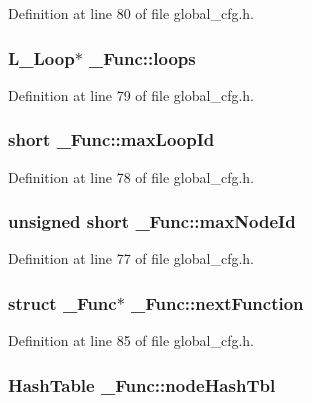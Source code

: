 Definition at line 80 of file global\_\-cfg.h.
\subsubsection{\setlength{\rightskip}{0pt plus 5cm}L\_\-Loop$\ast$ \bf{\_\-Func::loops}}\label{struct__Func_fe46df0a6639bb86229a61502c7448d3}




Definition at line 79 of file global\_\-cfg.h.
\subsubsection{\setlength{\rightskip}{0pt plus 5cm}short \bf{\_\-Func::max\-Loop\-Id}}\label{struct__Func_40490fbdaaf9e9e8d79f57413e8d32cf}




Definition at line 78 of file global\_\-cfg.h.
\subsubsection{\setlength{\rightskip}{0pt plus 5cm}unsigned short \bf{\_\-Func::max\-Node\-Id}}\label{struct__Func_facf362425dff8500e7dd797e6c30db2}




Definition at line 77 of file global\_\-cfg.h.
\subsubsection{\setlength{\rightskip}{0pt plus 5cm}struct \bf{\_\-Func}$\ast$ \bf{\_\-Func::next\-Function}}\label{struct__Func_200f6f935cebc75386eb4c950180c1ba}




Definition at line 85 of file global\_\-cfg.h.
\subsubsection{\setlength{\rightskip}{0pt plus 5cm}\bf{Hash\-Table} \bf{\_\-Func::node\-Hash\-Tbl}}\label{struct__Func_5b035942124fa099f635c926ab18cc42}




